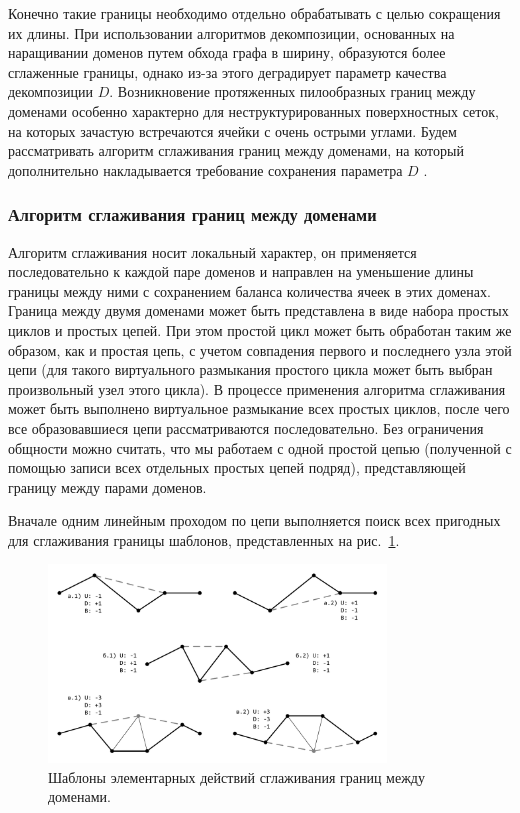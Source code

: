 Конечно такие границы необходимо отдельно обрабатывать с целью сокращения их длины.
При использовании алгоритмов декомпозиции, основанных на наращивании доменов\label{term:alg_decomp_rgrow3} путем обхода графа в ширину, образуются более сглаженные границы, однако из-за этого деградирует параметр качества декомпозиции $D$.
Возникновение протяженных пилообразных границ между доменами особенно характерно для неструктурированных поверхностных сеток, на которых зачастую встречаются ячейки с очень острыми углами.
Будем рассматривать алгоритм сглаживания границ между доменами, на который дополнительно накладывается требование сохранения параметра $D$ \cite{Bagrov2021Smooth}.

\subsubsection{Алгоритм сглаживания границ между доменами}

Алгоритм сглаживания\label{term:alg_smooth_domains_border} носит локальный характер, он применяется последовательно к каждой паре доменов и направлен на уменьшение длины границы между ними с сохранением баланса количества ячеек в этих доменах.
Граница между двумя доменами может быть представлена в виде набора простых циклов и простых цепей.
При этом простой цикл может быть обработан таким же образом, как и простая цепь, с учетом совпадения первого и последнего узла этой цепи (для такого виртуального размыкания простого цикла может быть выбран произвольный узел этого цикла).
В процессе применения алгоритма сглаживания может быть выполнено виртуальное размыкание всех простых циклов, после чего все образовавшиеся цепи рассматриваются последовательно.
Без ограничения общности можно считать, что мы работаем с одной простой цепью (полученной с помощью записи всех отдельных простых цепей подряд), представляющей границу между парами доменов.

Вначале одним линейным проходом по цепи выполняется поиск всех пригодных для сглаживания границы шаблонов\label{term:smooth_template}, представленных на рис.~\ref{fig:text_2_smooth_smooth_border}.

\begin{figure}[ht]
\centering
\includegraphics[width=0.8\textwidth]{./pics/text_2_smooth/smooth-border.pdf}
\singlespacing
{}\caption{Шаблоны элементарных действий сглаживания границ между доменами.}
\label{fig:text_2_smooth_smooth_border}
\end{figure}

